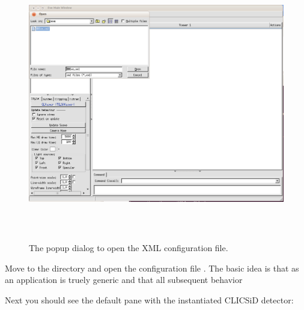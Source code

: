 \documentclass[10pt,a4paper]{article}
\begin{document}
\begin{figure}[h]
  \begin{center}
    \includegraphics[height=120mm] {DDEve_2.png}
    \caption{The \DDE popup dialog to open the XML configuration file.}
    \label{fig:DDEve_2.png}
  \end{center}
\end{figure}

\noindent
Move to the directory  and open the 
\DDE configuration file . The basic idea is that \DDE as an 
application is truely generic and that all subsequent behavior 


\newpage
\noindent
Next you should see the default pane with the instantiated CLICSiD detector:
\end{document}
